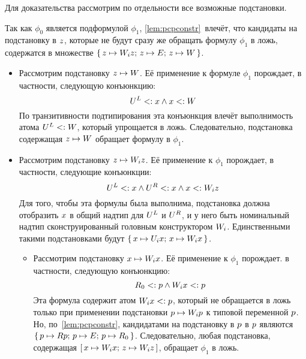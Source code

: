 \begin{proof*}
Для доказательства рассмотрим по отдельности все возможные подстановки.

Так как $\phi_{0}$ является подформулой $\phi_1$, \autoref{lem:pcpconstr}~влечёт, что 
кандидаты на подстановку в $z$, которые не будут сразу же обращать формулу $\phi_{1}$ в ложь, содержатся в множестве $\lbrace \, z \mapsto {W}_{i}z; \, z \mapsto {E}; \, z \mapsto {W} \, \rbrace$.

\begin{itemize}
    \item 
        Рассмотрим подстановку $z \mapsto {W}$. Её применение к формуле $\phi_{1}$ порождает, в частности, следующую конъюнкцию:
        \[
            {U}^{L} <: x \land x <: {W}
        \]
        По транзитивности подтипирования эта конъюнкция влечёт выполнимость атома ${U}^{L} <: {W}$, который упрощается в ложь. Следовательно, подстановка содержащая $z \mapsto {W}$ обращает формулу в $\phi_1$.
    \item
        Рассмотрим подстановку $z \mapsto {W}_{i}z$. Её применение к $\phi_{1}$ порождает, в частности, следующие конъюнкции:
        \[
         {U}^{L} <: x \land {U}^{R} <: x \land x <: {W}_{i}z
        \]
        Для того, чтобы эта формулы была выполнима, подстановка должна отобразить $x$ в общий надтип для ${U}^{L}$ и ${U}^{R}$, и у него быть номинальный надтип сконструированный головным конструктором ${W}_{i}$. Единственными такими подстановками будут $\lbrace \, x \mapsto {U}_{i}x; \, x \mapsto {W}_{i}x \, \rbrace$.
        \begin{itemize}
            \item 
                Рассмотрим подстановку $x \mapsto {W}_{i}x$. Её применение к $\phi_{1}$ порождает. в частности, следующую конъюнкцию:
                \[
                 {R}_{0} <: p \land {W}_{i}x <: p
                \]
                Эта формула содержит атом ${W}_{i}x <: p$, который не обращается в ложь только при применении подстановки $p \mapsto {W}_{i}p$ к типовой переменной $p$. Но, по~\autoref{lem:pcpconstr}, кандидатами на подстановку в $p$ в $p$ являются $\lbrace \, p \mapsto {R}p; \, p \mapsto {E}; \, p \mapsto {R}_{0} \, \rbrace$. Следовательно, любая подстановка, содержащая $\textrm{[} \, x \mapsto {W}_{i}x; \, z \mapsto {W}_{i}z \, \textrm{]}$, обращает $\phi_1$ в ложь.

\end{itemize}
\end{itemize}
\end{proof*}
